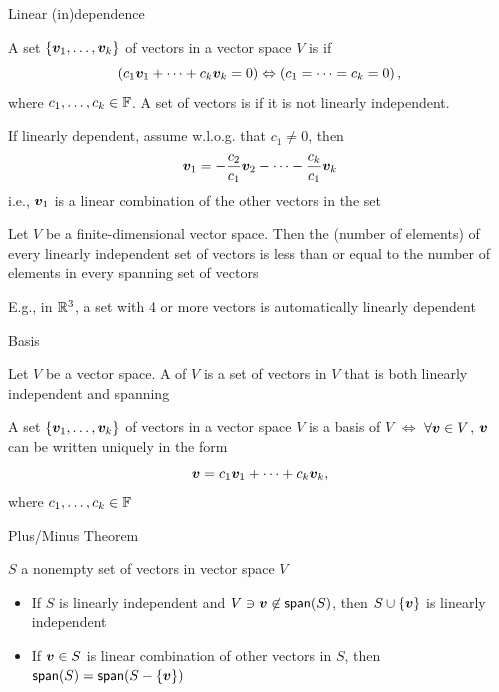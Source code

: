 \documentclass[aspectratio=169]{beamer}\usepackage[]{graphicx}\usepackage[]{xcolor}
\begin{document}
\begin{frame}{Linear (in)dependence}
	\begin{definition}
		A set $\{\bm{v}_1,\ldots,\bm{v}_k\}$ of vectors in a vector space $V$ is  if
		\[
		\left(c_1\bm{v}_1+\cdots+c_k\bm{v}_k=0\right)
		\Leftrightarrow
		\left(c_1=\cdots=c_k=0\right),
		\]
		where $c_1,\ldots,c_k\in\mathbb{F}$. 
		A set of vectors is  if it is not linearly independent.
	\end{definition}
	\vfill
	If linearly dependent, assume w.l.o.g. that $c_1\neq 0$, then
	\[
	\bm{v}_1 = -\frac{c_2}{c_1}\bm{v}_2-\cdots-\frac{c_k}{c_1}\bm{v}_k
	\]
	i.e., $\bm{v}_1$ is a linear combination of the other vectors in the set
\end{frame}


\begin{frame}
	\begin{theorem}
		Let $V$ be a finite-dimensional vector space. Then the  (number of elements) of every linearly independent set of vectors is less than or equal to the number of elements in every spanning set of vectors
	\end{theorem}
\vfill
E.g., in $\mathbb{R}^3$, a set with 4 or more vectors is automatically linearly dependent
\end{frame}


\begin{frame}{Basis}
	\begin{definition}[Basis]
		Let $V$ be a vector space. A  of $V$ is a set of vectors in $V$ that is both linearly independent and spanning
	\end{definition}
	\vfill
	\begin{theorem}
		A set $\{\bm{v}_1,\ldots,\bm{v}_k\}$ of vectors in a vector space $V$ is a basis of $V$ $\iff$ $\forall \bm{v}\in V$, $\bm{v}$ can be written uniquely in the form
		\[
		\bm{v}=c_1\bm{v}_1+\cdots+c_k\bm{v}_k,
		\]
		where $c_1,\ldots,c_k\in\mathbb{F}$
	\end{theorem}
\end{frame}

\begin{frame}{Plus/Minus Theorem}
	\begin{theorem}
		$S$ a nonempty set of vectors in vector space $V$
		\begin{itemize}
			\item If $S$ is linearly independent and $V\ni\bm{v}\not\in \mathsf{span}(S)$, then $S\cup\{\bm{v}\}$ is linearly independent
			\item If $\bm{v}\in S$ is linear combination of other vectors in $S$, then $\mathsf{span}(S)=\mathsf{span}(S-\{\bm{v}\})$
		\end{itemize}
	\end{theorem}
\end{frame}
\end{document}
